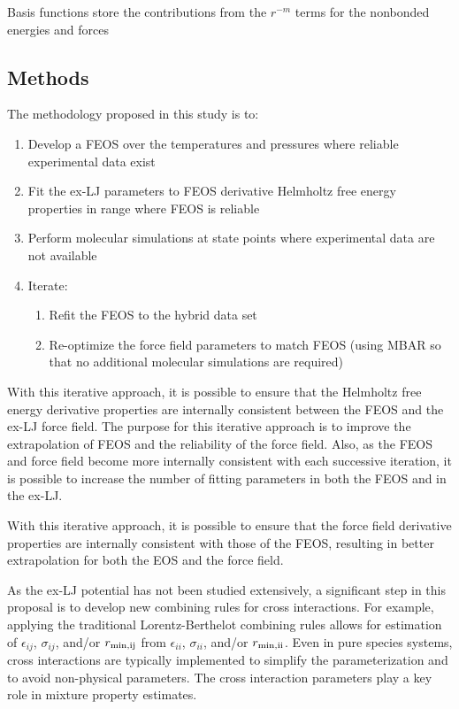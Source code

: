 \documentclass[11pt,a4paper]{article}
\begin{document}
Basis functions store the contributions from the $r^{-m}$ terms for the nonbonded energies and forces
  
\subsection{Methods}
  
  
  
The methodology proposed in this study is to:
\begin{enumerate}
	\item Develop a FEOS over the temperatures and pressures where reliable experimental data exist
	\item Fit the ex-LJ parameters to FEOS derivative Helmholtz free energy properties in range where FEOS is reliable
	\item Perform molecular simulations at state points where experimental data are not available
	\item Iterate:
	\begin{enumerate}
		\item Refit the FEOS to the hybrid data set
		\item Re-optimize the force field parameters to match FEOS (using MBAR so that no additional molecular simulations are required)
	\end{enumerate}
\end{enumerate}

With this iterative approach, it is possible to ensure that the Helmholtz free energy derivative properties are internally consistent between the FEOS and the ex-LJ force field. The purpose for this iterative approach is to improve the extrapolation of FEOS and the reliability of the force field. Also, as the FEOS and force field become more internally consistent with each successive iteration, it is possible to increase the number of fitting parameters in both the FEOS and in the ex-LJ. 

With this iterative approach, it is possible to ensure that the force field derivative properties are internally consistent with those of the FEOS, resulting in better extrapolation for both the EOS and the force field. 

As the ex-LJ potential has not been studied extensively, a significant step in this proposal is to develop new combining rules for cross interactions. For example, applying the traditional Lorentz-Berthelot combining rules allows for estimation of $\epsilon_{ij}$, $\sigma_{ij}$, and/or $r_{\rm min,ij}$ from $\epsilon_{ii}$, $\sigma_{ii}$, and/or $r_{\rm min,ii}$. Even in pure species systems, cross interactions are typically implemented to simplify the parameterization and to avoid non-physical parameters. The cross interaction parameters play a key role in mixture property estimates.  
\end{document}
